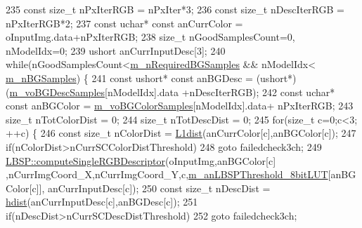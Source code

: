 \begin{DoxyCode}
235             \textcolor{keyword}{const} \textcolor{keywordtype}{size\_t} nPxIterRGB = nPxIter*3;
236             \textcolor{keyword}{const} \textcolor{keywordtype}{size\_t} nDescIterRGB = nPxIterRGB*2;
237             \textcolor{keyword}{const} uchar* \textcolor{keyword}{const} anCurrColor = oInputImg.data+nPxIterRGB;
238             \textcolor{keywordtype}{size\_t} nGoodSamplesCount=0, nModelIdx=0;
239             ushort anCurrInputDesc[3];
240             \textcolor{keywordflow}{while}(nGoodSamplesCount<\mbox{\hyperlink{class_background_subtractor_l_o_b_s_t_e_r_acb558aefc1b6205a63c1906b6fd1eeff}{m\_nRequiredBGSamples}} && nModelIdx<
      \mbox{\hyperlink{class_background_subtractor_l_o_b_s_t_e_r_a20c53540b952d608d849a305fd5eed89}{m\_nBGSamples}}) \{
241                 \textcolor{keyword}{const} ushort* \textcolor{keyword}{const} anBGDesc = (ushort*)(\mbox{\hyperlink{class_background_subtractor_l_o_b_s_t_e_r_a3c49866ae652423b2173215957907d04}{m\_voBGDescSamples}}[nModelIdx].data
      +nDescIterRGB);
242                 \textcolor{keyword}{const} uchar* \textcolor{keyword}{const} anBGColor = \mbox{\hyperlink{class_background_subtractor_l_o_b_s_t_e_r_ac981b39f8ae7b28d3e4326d8e6be6332}{m\_voBGColorSamples}}[nModelIdx].data+
      nPxIterRGB;
243                 \textcolor{keywordtype}{size\_t} nTotColorDist = 0;
244                 \textcolor{keywordtype}{size\_t} nTotDescDist = 0;
245                 \textcolor{keywordflow}{for}(\textcolor{keywordtype}{size\_t} c=0;c<3; ++c) \{
246                     \textcolor{keyword}{const} \textcolor{keywordtype}{size\_t} nColorDist = \mbox{\hyperlink{_distance_utils_8h_ab6ec458f6d3fb6fb4e6cda3808e61703}{L1dist}}(anCurrColor[c],anBGColor[c]);
247                     \textcolor{keywordflow}{if}(nColorDist>nCurrSCColorDistThreshold)
248                         \textcolor{keywordflow}{goto} failedcheck3ch;
249                     \mbox{\hyperlink{class_l_b_s_p_a35f2abfacc0d540810d678ff5e8cd619}{LBSP::computeSingleRGBDescriptor}}(oInputImg,anBGColor[c]
      ,nCurrImgCoord\_X,nCurrImgCoord\_Y,c,\mbox{\hyperlink{class_background_subtractor_l_b_s_p_aefe69d94f08b2c4ba73ad1d254ad9153}{m\_anLBSPThreshold\_8bitLUT}}[anBGColor[c]],
      anCurrInputDesc[c]);
250                     \textcolor{keyword}{const} \textcolor{keywordtype}{size\_t} nDescDist = \mbox{\hyperlink{_distance_utils_8h_ab13812ef6e21af771d6c0a856cd941b0}{hdist}}(anCurrInputDesc[c],anBGDesc[c]);
251                     \textcolor{keywordflow}{if}(nDescDist>nCurrSCDescDistThreshold)
252                         \textcolor{keywordflow}{goto} failedcheck3ch;

\end{DoxyCode}
